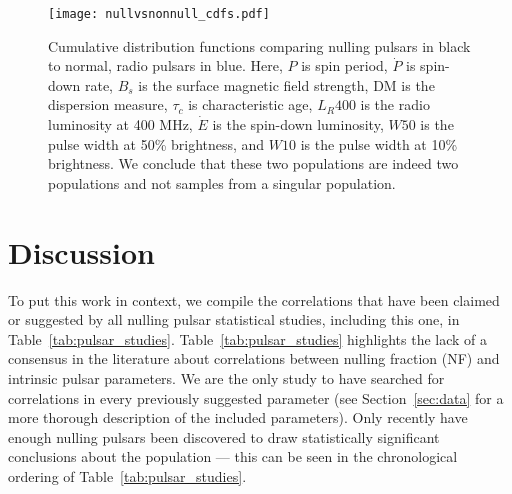 \documentclass[fleqn,usenatbib]{mnras}
\begin{document}
\begin{figure*} 
    \centering
    \texttt{[image: nullvsnonnull\_cdfs.pdf]}
    \caption{Cumulative distribution functions comparing nulling pulsars in black to normal, radio pulsars in blue. Here,  $P$ is spin period, $\dot{P}$ is spin-down rate, $B_s$ is the surface magnetic field strength, DM is the dispersion measure,    $\tau_c$ is characteristic age,  $L_R400$ is the radio luminosity at 400 MHz, $\dot{E}$ is the spin-down luminosity, $W50$ is the pulse width at 50\% brightness,  and $W10$ is the pulse width at 10\% brightness. We conclude that these two populations are indeed two populations and not samples from a singular population.}
    \label{fig:null_cdfs}
\end{figure*}




\section{Discussion}\label{sec:discussion}

To put this work in context, we compile the correlations that have been claimed or suggested by all nulling pulsar statistical studies, including this one, in Table~\ref{tab:pulsar_studies}. Table~\ref{tab:pulsar_studies} highlights the lack of a consensus in the literature about correlations between nulling fraction (NF) and intrinsic pulsar parameters. We are the only study to have searched for correlations in every previously suggested parameter (see Section~\ref{sec:data} for a more thorough description of the included parameters). Only recently have enough nulling pulsars been discovered to draw statistically significant conclusions about the population --- this can be seen in the chronological ordering of Table~\ref{tab:pulsar_studies}.
\end{document}
